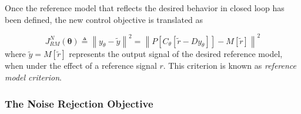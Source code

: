 Once the reference model that reflects the desired behavior in closed loop has been defined, the new control objective is translated as

\begin{equation}
   J_{RM}^N(\bm{\theta}) \triangleq \left\lVert y_\theta - \tilde{y} \right\lVert^{2} = \left\lVert P[C_\theta[\tilde{r}-Dy_\theta]] - M[\tilde{r}] \right\lVert^{2}
   \label{eq:Jy}
\end{equation}
 where $\tilde{y} = M[\tilde{r}]$ represents the output signal of the desired reference model, when under the effect of a reference signal $r$. This criterion is known as \textit{reference model criterion}.


\subsubsection{The Noise Rejection Objective}%
\label{sub:the_noise_rejection_objective}

